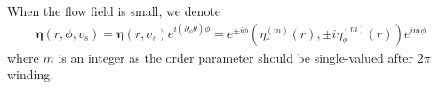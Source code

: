 \documentclass[aps,prl,preprint]{revtex4-2}
\begin{document}

When the flow field is small, we denote
\begin{align}
    \bm{\eta}(r, \phi, v_s) = \bm{\eta}(r, v_s)e^{i(\partial_\phi\theta)\phi} = e^{\pm i\phi}\left(\eta_r^{(m)}(r), \pm i\eta_\phi^{(m)}(r)\right)e^{im\phi}\label{uniform_flow_eta}
\end{align}
where $m$ is an integer as the order parameter should be single-valued after $2\pi$ winding.
\end{document}
